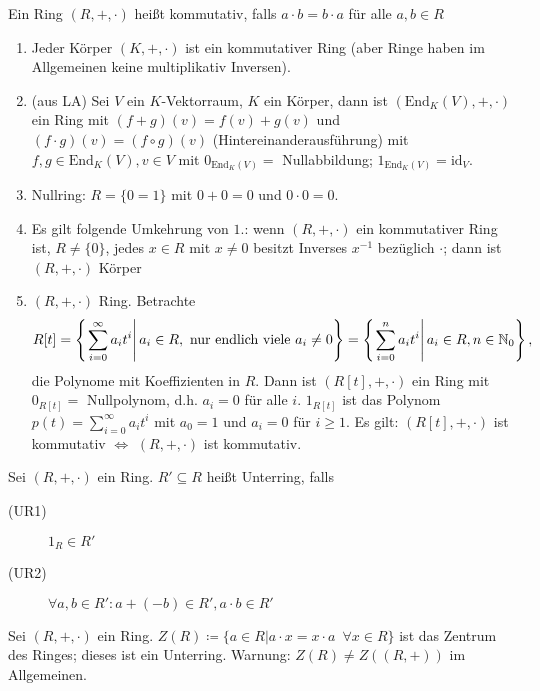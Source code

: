 \documentclass[12pt,a4paper]{scrartcl}
\begin{document}
\begin{defi}
	Ein Ring $(R, +,\cdot)$ heißt kommutativ, falls $a\cdot b = b\cdot a$ für alle $a,b\in R$
\end{defi}	

\begin{bsp}
	\leavevmode
	\begin{enumerate}
		\item Jeder Körper $(K,+,\cdot)$ ist ein kommutativer Ring (aber Ringe haben im Allgemeinen keine multiplikativ Inversen).
		\item (aus LA) Sei $V$ ein $K$-Vektorraum, $K$ ein Körper, dann ist $(\text{End}_K(V),+,\cdot)$ ein Ring mit $(f+g)(v) = f(v)+g(v)$ und $(f\cdot g)(v) = (f\circ g)(v)$ (Hintereinanderausführung) mit $f,g\in \text{End}_K(V), v\in V$ mit $0_{\text{End}_K(V)} =$ Nullabbildung; $1_{\text{End}_K(V)} = \text{id}_V$.
		\item Nullring: $R = \{0=1\}$ mit $0+0 = 0$ und $0\cdot 0 = 0$.
		\item Es gilt folgende Umkehrung von $1.$: wenn $(R,+,\cdot)$ ein kommutativer Ring ist, $R\neq \{0\}$, jedes $x\in R$ mit $x\neq 0$ besitzt Inverses $x^{-1}$ bezüglich $\cdot$; dann ist $(R, +, \cdot )$ Körper
		\item $(R, +, \cdot)$ Ring. Betrachte
		\[ R[t] = \left\{ \left. \sum_{i=0}^{\infty} a_it^i \right| a_i\in R, \text{ nur endlich viele }a_i\neq 0\right\}  = \left\{\left. \sum_{i=0}^{n} a_it^i \right| a_i\in R, n\in \mathbb N_0\right\},\]
		die Polynome mit Koeffizienten in $R$. Dann ist $(R[t], +, \cdot)$ ein Ring mit $0_{R[t]} =$ Nullpolynom, d.h. $a_i = 0$ für alle $i$. $1_{R[t]}$ ist das Polynom $p(t) = \sum_{i = 0}^{\infty}a_it^i$ mit $a_0 = 1$ und $a_i = 0$ für $i\geq 1$.  Es gilt: $(R[t], +,\cdot)$ ist kommutativ $\Leftrightarrow$ $(R,+,\cdot)$ ist kommutativ.
	\end{enumerate}
\end{bsp}	

\begin{defi}
	Sei $(R,+,\cdot)$ ein Ring. $R'\subseteq R$ heißt Unterring, falls
	\begin{description}
		\item[(UR1)] $1_R\in R'$
		\item[(UR2)] $\forall a, b\in R': a+(-b)\in R', a\cdot b \in R'$
	\end{description}
\end{defi}

\begin{bsp}
	Sei $(R,+,\cdot)$ ein Ring. $Z(R) \coloneqq \{a\in R|a\cdot x = x\cdot a \enspace \forall x\in R\}$ ist das Zentrum des Ringes; dieses ist ein Unterring. Warnung: $Z(R) \neq Z((R,+))$ im Allgemeinen.
\end{bsp}	
\end{document}
